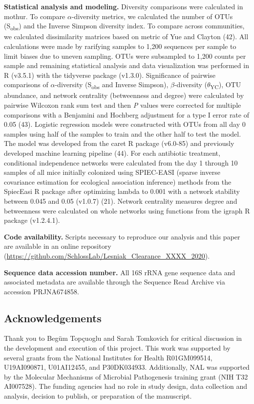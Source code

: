 \documentclass[11pt,]{article}
\begin{document}
\textbf{Statistical analysis and modeling.} Diversity comparisons were
calculated in mothur. To compare \(\alpha\)-diversity metrics, we
calculated the number of OTUs (S\textsubscript{obs}) and the Inverse
Simpson diversity index. To compare across communities, we calculated
dissimilarity matrices based on metric of Yue and Clayton (42). All
calculations were made by rarifying samples to 1,200 sequences per
sample to limit biases due to uneven sampling. OTUs were subsampled to
1,200 counts per sample and remaining statistical analysis and data
visualization was performed in R (v3.5.1) with the tidyverse package
(v1.3.0). Significance of pairwise comparisons of \(\alpha\)-diversity
(S\textsubscript{obs} and Inverse Simpson), \(\beta\)-diversity
(\(\theta\)\textsubscript{YC}), OTU abundance, and network centrality
(betweenness and degree) were calculated by pairwise Wilcoxon rank sum
test and then \emph{P} values were corrected for multiple comparisons
with a Benjamini and Hochberg adjustment for a type I error rate of 0.05
(43). Logistic regression models were constructed with OTUs from all day
0 samples using half of the samples to train and the other half to test
the model. The model was developed from the caret R package (v6.0-85)
and previously developed machine learning pipeline (44). For each
antibiotic treatment, conditional independence networks were calculated
from the day 1 through 10 samples of all mice initially colonized using
SPIEC-EASI (sparse inverse covariance estimation for ecological
association inference) methods from the SpiecEasi R package after
optimizing lambda to 0.001 with a network stability between 0.045 and
0.05 (v1.0.7) (21). Network centrality measures degree and betweenness
were calculated on whole networks using functions from the igraph R
package (v1.2.4.1).

\textbf{Code availability.} Scripts necessary to reproduce our analysis
and this paper are available in an online repository
(\url{https://github.com/SchlossLab/Lesniak_Clearance_XXXX_2020}).

\textbf{Sequence data accession number.} All 16S rRNA gene sequence data
and associated metadata are available through the Sequence Read Archive
via accession PRJNA674858.

\hypertarget{acknowledgements}{%
\subsection{Acknowledgements}\label{acknowledgements}}

Thank you to Begüm Topçuoglu and Sarah Tomkovich for critical discussion
in the development and execution of this project. This work was
supported by several grants from the National Institutes for Health
R01GM099514, U19AI090871, U01AI12455, and P30DK034933. Additionally, NAL
was supported by the Molecular Mechanisms of Microbial Pathogenesis
training grant (NIH T32 AI007528). The funding agencies had no role in
study design, data collection and analysis, decision to publish, or
preparation of the manuscript.
\end{document}

